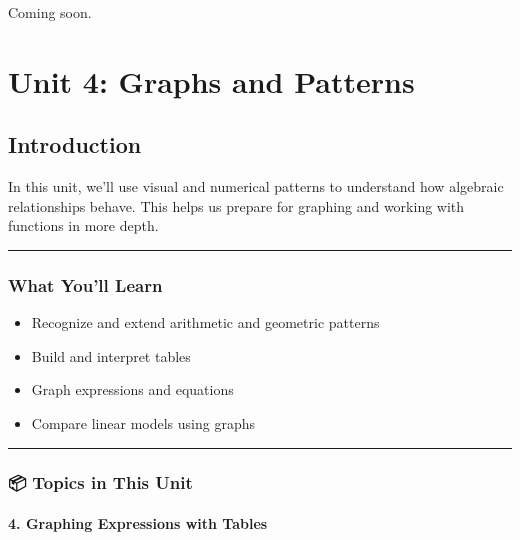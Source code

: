 \documentclass[
  letterpaper,
]{scrrept}
\providecommand{\tightlist}{%
  \setlength{\itemsep}{0pt}\setlength{\parskip}{0pt}}
\begin{document}

Coming soon.

\part{Unit 4: Graphs and Patterns}

\chapter*{Introduction}\label{introduction-3}


In this unit, we'll use visual and numerical patterns to understand how
algebraic relationships behave. This helps us prepare for graphing and
working with functions in more depth.

\begin{center}\rule{0.5\linewidth}{0.5pt}\end{center}

\section*{What You'll Learn}\label{what-youll-learn-2}


\begin{itemize}
\tightlist
\item
  Recognize and extend arithmetic and geometric patterns
\item
  Build and interpret tables
\item
  Graph expressions and equations
\item
  Compare linear models using graphs
\end{itemize}

\begin{center}\rule{0.5\linewidth}{0.5pt}\end{center}

\section*{📦 Topics in This Unit}\label{topics-in-this-unit-2}


\subsection*{4. Graphing Expressions with
Tables}\label{graphing-expressions-with-tables}
\end{document}
